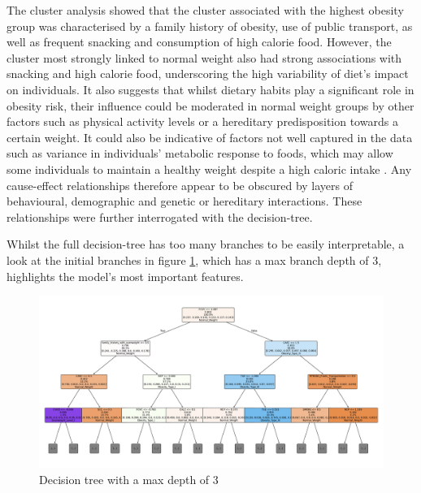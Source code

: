 The cluster analysis showed that the cluster associated with the highest obesity group was characterised by a family history of obesity, use of public transport, as well as frequent snacking and consumption of high calorie food. However, the cluster most strongly linked to normal weight also had strong associations with snacking and high calorie food, underscoring the high variability of diet's impact on individuals. It also suggests that whilst dietary habits play a significant role in obesity risk, their influence could be moderated in normal weight groups by other factors such as physical activity levels or a hereditary predisposition towards a certain weight. It could also be indicative of factors not well captured in the data such as variance in individuals' metabolic response to foods, which may allow some individuals to maintain a healthy weight despite a high caloric intake \cite{Piaggi2019}. Any cause-effect relationships therefore appear to be obscured by layers of behavioural, demographic and  genetic or hereditary interactions. These relationships were further interrogated with the decision-tree. 

Whilst the full decision-tree has too many branches to be easily interpretable, a look at the initial branches in figure \ref{fig:decision_tree}, which has a max branch depth of 3, highlights the model's most important features.

\begin{figure}
    \centering
    \includegraphics[width=\textwidth]{decision_tree.pdf} %
    \caption{Decision tree with a max depth of 3}
    \label{fig:decision_tree}
\end{figure}

